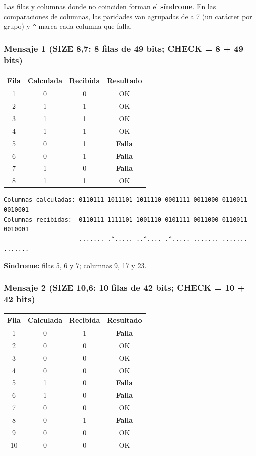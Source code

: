 \documentclass[11pt,a4paper]{article}
\begin{document}
Las filas y columnas donde no coinciden forman el \textbf{síndrome}. En las comparaciones de columnas, las paridades van agrupadas de a 7 (un carácter por grupo) y \texttt{\^{}} marca cada columna que falla.

\subsubsection*{Mensaje 1 (SIZE 8,7: 8 filas de 49 bits; CHECK = 8 + 49 bits)}

\begin{center}
\begin{tabular}{|c|c|c|c|}
\hline
\textbf{Fila} & \textbf{Calculada} & \textbf{Recibida} & \textbf{Resultado} \\
\hline
1 & 0 & 0 & OK \\
2 & 1 & 1 & OK \\
3 & 1 & 1 & OK \\
4 & 1 & 1 & OK \\
5 & 0 & 1 & \textbf{Falla} \\
6 & 0 & 1 & \textbf{Falla} \\
7 & 1 & 0 & \textbf{Falla} \\
8 & 1 & 1 & OK \\
\hline
\end{tabular}
\end{center}

\begin{verbatim}
Columnas calculadas: 0110111 1011101 1011110 0001111 0011000 0110011 0010001
Columnas recibidas:  0110111 1111101 1001110 0101111 0011000 0110011 0010001
                     ....... .^..... ..^.... .^..... ....... ....... .......
\end{verbatim}

\noindent\textbf{Síndrome:} filas 5, 6 y 7; columnas 9, 17 y 23.

\subsubsection*{Mensaje 2 (SIZE 10,6: 10 filas de 42 bits; CHECK = 10 + 42 bits)}

\begin{center}
\begin{tabular}{|c|c|c|c|}
\hline
\textbf{Fila} & \textbf{Calculada} & \textbf{Recibida} & \textbf{Resultado} \\
\hline
1 & 0 & 1 & \textbf{Falla} \\
2 & 0 & 0 & OK \\
3 & 0 & 0 & OK \\
4 & 0 & 0 & OK \\
5 & 1 & 0 & \textbf{Falla} \\
6 & 1 & 0 & \textbf{Falla} \\
7 & 0 & 0 & OK \\
8 & 0 & 1 & \textbf{Falla} \\
9 & 0 & 0 & OK \\
10 & 0 & 0 & OK \\
\hline
\end{tabular}
\end{center}
\end{document}
